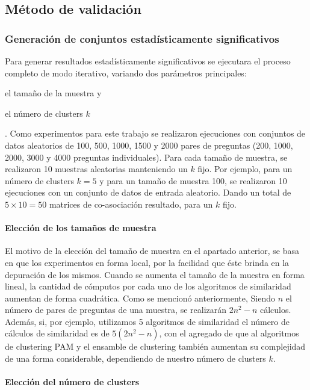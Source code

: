 \subsection{Método de validación}

\subsubsection{Generación de conjuntos estadísticamente significativos}

Para generar resultados estadísticamente significativos se ejecutara el proceso completo de modo iterativo, variando dos parámetros principales: \begin{enumerate*} [label=(\roman*)] \item el tamaño de la muestra y \item el número de clusters \(k\)\end{enumerate*}. Como experimentos para este trabajo se realizaron ejecuciones con conjuntos de datos aleatorios de 100, 500, 1000, 1500 y 2000 pares de preguntas (200, 1000, 2000, 3000 y 4000 preguntas individuales). Para cada tamaño de muestra, se realizaron 10 muestras aleatorias manteniendo un \(k\) fijo. Por ejemplo, para un número de clusters \(k = 5\) y para un tamaño de muestra 100, se realizaron 10 ejecuciones con un conjunto de datos de entrada aleatorio. Dando un total de \(5 \times 10 = 50\) matrices de co-asociación resultado, para un \(k\) fijo.

\paragraph{Elección de los tamaños de muestra}
El motivo de la elección del tamaño de muestra en el apartado anterior, se basa en que los experimentos en forma local, por la facilidad que éste brinda en la depuración de los mismos. Cuando se aumenta el tamaño de la muestra en forma lineal, la cantidad de cómputos por cada uno de los algoritmos de similaridad aumentan de forma cuadrática. Como se mencionó anteriormente, Siendo \(n\) el número de pares de preguntas de una muestra, se realizarán \(2n^2-n\) cálculos. Además, si, por ejemplo, utilizamos 5 algoritmos de similaridad el número de cálculos de similaridad es de \(5(2n^2-n)\), con el agregado de que al algoritmos de clustering PAM y el ensamble de clustering también aumentan su complejidad de una forma considerable, dependiendo de nuestro número de clusters \(k\).

\paragraph{Elección del número de clusters}

